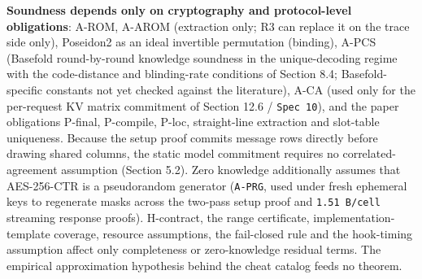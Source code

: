 \documentclass[10pt]{article}
\begin{document}
\textbf{Soundness depends only on cryptography and protocol-level obligations}: A-ROM, A-AROM (extraction only; R3 can replace it on the trace side only), Poseidon2 as an ideal invertible permutation (binding), A-PCS (Basefold round-by-round knowledge soundness in the unique-decoding regime with the code-distance and blinding-rate conditions of Section 8.4; Basefold-specific constants not yet checked against the literature), A-CA (used only for the per-request KV matrix commitment of Section 12.6 / \texttt{Spec 10}), and the paper obligations P-final, P-compile, P-loc, straight-line extraction and slot-table uniqueness. Because the setup proof commits message rows directly before drawing shared columns, the static model commitment requires no correlated-agreement assumption (Section 5.2). Zero knowledge additionally assumes that AES-256-CTR is a pseudorandom generator (\texttt{A-PRG}, used under fresh ephemeral keys to regenerate masks across the two-pass setup proof and \texttt{1.\allowbreak{}51 B/cell} streaming response proofs). H-contract, the range certificate, implementation-template coverage, resource assumptions, the fail-closed rule and the hook-timing assumption affect only completeness or zero-knowledge residual terms. The empirical approximation hypothesis behind the cheat catalog feeds no theorem.
\end{document}
